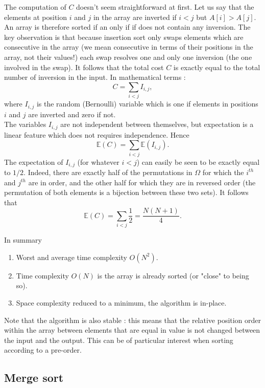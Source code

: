\documentclass[12pt]{article}
\theoremstyle{plain}
\theoremstyle{remark}
\begin{document}
The computation of $C$ doesn't seem straightforward at first. Let us say that
the elements at position $i$ and $j$ in the array are inverted if $i < j$ but 
$A[i] > A[j].$ An array is therefore sorted if an only if if does not contain
any inversion. The key observation is that because insertion sort only swaps
elements which are consecutive in the array (we mean consecutive in terms of
their positions in the array, not their values!) each swap resolves one and
only one inversion (the one involved in the swap). It follows that the total
cost $C$ is exactly equal to the total number of inversion in the input. In
mathematical terms :
$$
 C = \sum_{i < j} I_{i,j},
$$
where $I_{i,j}$ is the random (Bernoulli) variable which is one if elements
in positions $i$ and $j$ are inverted and zero if not.\\
The variables $I_{i,j}$ are not independent between themselves, but expectation
is a linear feature which does not requires independence. Hence
$$
\mathbb{E}(C) = \sum_{i<j} \mathbb{E}(I_{i,j}).
$$
The expectation of $I_{i,j}$ (for whatever $i < j$) can easily be seen to be
exactly equal to $1/2.$ Indeed, there are exactly half of the permutations in
$\Omega$ for which the $i^{th}$ and $j^{th}$ are in order, and the other half
for which they are in reversed order (the permutation of both elements is a
bijection between these two sets). It follows that
$$
\mathbb{E}(C) = \sum_{i<j} \frac{1}{2} = \frac{N(N+1)}{4}.
$$

In summary

\begin{enumerate}
	\item Worst and average time complexity $O(N^2)$.
	\item Time complexity $O(N)$ is the array is already sorted (or "close" to
		being so).
	\item Space complexity reduced to a minimum, the algorithm is in-place.
\end{enumerate}

Note that the algorithm is also stable : this means that the relative position order within the array
between elements that are equal in value is not changed between the input and
the output. This can be of particular interest when sorting according to a
pre-order.

\subsection{Merge sort}
\end{document}
